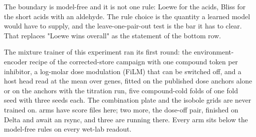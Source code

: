  The boundary is model-free and it is not one rule:
Loewe for the acids, Bliss for the short acids with an aldehyde. The rule choice is the
quantity a learned model would have to supply, and the leave-one-pair-out test is the
bar it has to clear. That replaces "Loewe wins overall" as the statement of the bottom
row.

 The mixture trainer of this experiment ran its first
round: the environment-encoder recipe of the corrected-store campaign with one compound
token per inhibitor, a log-molar dose modulation (FiLM) that can be switched off, and a
host head read at the mean over genes, fitted on the published dose anchors alone or on the
anchors with the titration run, five compound-cold folds of one fold seed with three
seeds each. The combination plate and the isobole grids are never trained on.
\hydarmsscored{} arms have score files here; two more, the dose-off pair, finished on
Delta and await an rsync, and three are running there. Every arm sits below the
model-free rules on every wet-lab readout.

